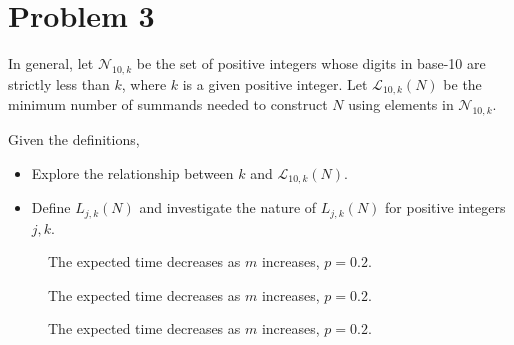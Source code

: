 \documentclass{article}
\begin{document}
\section{Problem 3}
In general, let  $\mathcal{N}_{10, k}$ be the set of positive integers whose digits in base-10 are strictly less than $k$, where $k$ is a given positive integer. Let $\mathcal{L}_{10,k}(N)$ be the minimum number of summands needed to construct $N$ using elements in $\mathcal{N}_{10,k}$.

\begin{problem}
  Given the definitions, 
  \begin{itemize}
    \item Explore the relationship between $k$ and $\mathcal{L}_{10, k}(N)$.
    \item Define $L_{j, k}(N)$ and investigate the nature of $L_{j, k}(N)$ for positive integers $j, k$.
  \end{itemize}
\end{problem}

\begin{figure}[htbp]
  \centering
  \caption{The expected time decreases as $m$ increases, $p = 0.2$.}
  \label{fig:decreasing}
\end{figure}
\begin{figure}[htbp]
  \centering
  \caption{The expected time decreases as $m$ increases, $p = 0.2$.}
  \label{fig:decreasing2}
\end{figure}
\begin{figure}[htbp]
  \centering
  \caption{The expected time decreases as $m$ increases, $p = 0.2$.}
  \label{fig:decreasing3}
\end{figure}
\end{document}
